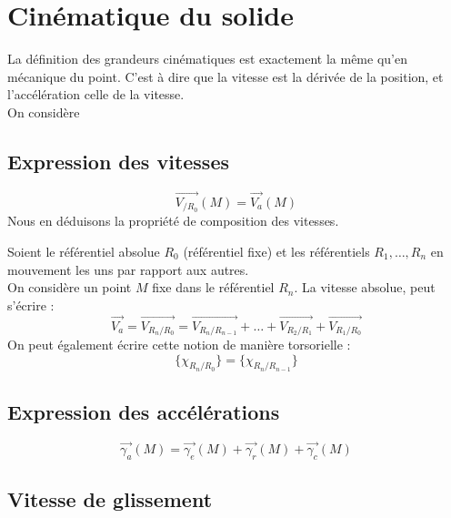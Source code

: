 \chapter{Cinématique du solide}
La définition des grandeurs cinématiques est exactement la même qu'en mécanique du point. C'est à dire que la vitesse est la dérivée de la position, et l'accélération celle de la vitesse. \\
On considère
\section{Expression des vitesses}
$$\overrightarrow{V_{/R_0}}(M)=\overrightarrow{V_a}(M)$$
Nous en déduisons la propriété de composition des vitesses.
\begin{thm}
Soient le référentiel absolue $R_0$ (référentiel fixe) et les référentiels $R_1,\hdots,R_n$ en mouvement les uns par rapport aux autres. \\
On considère un point $M$ fixe dans le référentiel $R_n$.
La vitesse absolue, peut s'écrire :
$$\overrightarrow{V_a}=\overrightarrow{V_{R_n/R_0}}=\overrightarrow{V_{R_n/R_{n-1}}}+\hdots+\overrightarrow{V_{R_2/R_1}}+\overrightarrow{V_{R_1/R_0}}$$
On peut également écrire cette notion de manière torsorielle :
$$\{\chi_{R_n/R_0}\}=\{\chi_{R_n/R_{n-1}}\}$$
\end{thm}
\section{Expression des accélérations}
$$\overrightarrow{\gamma_a}(M)=\overrightarrow{\gamma_e}(M)+\overrightarrow{\gamma_r}(M)+\overrightarrow{\gamma_c}(M)$$
\begin{thm}

\end{thm}
\section{Vitesse de glissement}